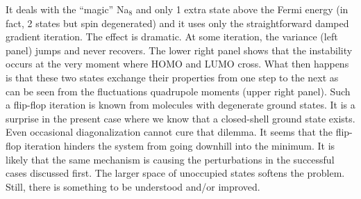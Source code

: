 \documentclass[12pt,a4paper]{article}
\begin{document}
\medskip

It deals with the ``magic'' Na$_8$ and only 1 extra state above the
Fermi energy (in fact, 2 states but spin degenerated) and it uses only
the straightforward damped gradient iteration.  The effect is
dramatic.  At some iteration, the variance (left panel) jumps and
never recovers. The lower right panel shows that the instability
occurs at the very moment where HOMO and LUMO cross.  What then
happens is that these two states exchange their properties from one
step to the next as can be seen from the fluctuations quadrupole
moments (upper right panel). Such a flip-flop iteration is known from
molecules with degenerate ground states. It is a surprise in the
present case where we know that a closed-shell ground state exists.
Even occasional diagonalization cannot cure that dilemma. It seems
that the flip-flop iteration hinders the system from going downhill
into the minimum.  It is likely that the same mechanism is causing the
perturbations in the successful cases discussed first. The larger space
of unoccupied states softens the problem. Still, there is something
to be understood and/or improved.
\end{document}
